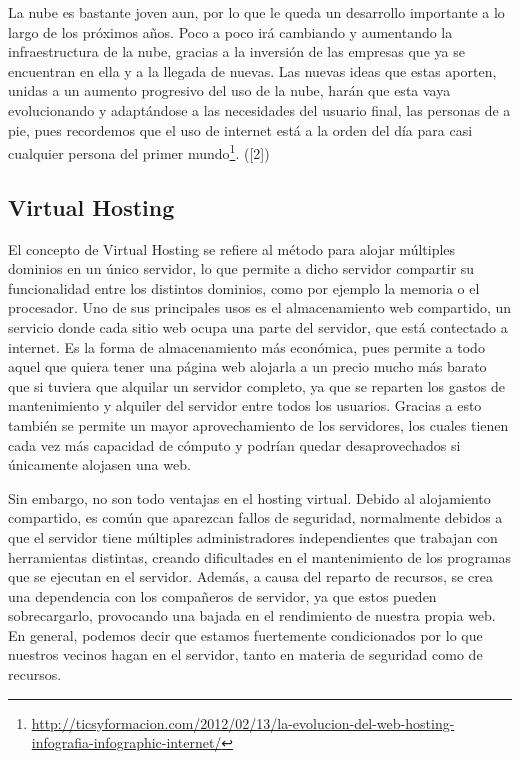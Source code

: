\documentclass[a4paper, 10pt]{article} %
\begin{document}
La nube es bastante joven aun, por lo que le queda un desarrollo importante a lo largo de los próximos años. Poco a poco irá cambiando y aumentando la infraestructura de la nube, gracias a la inversión de las empresas que ya se encuentran en ella y a la llegada de nuevas. Las nuevas ideas que estas aporten, unidas a un aumento progresivo del uso de la nube, harán que esta vaya evolucionando y adaptándose a las necesidades del usuario final, las personas de a pie, pues recordemos que el uso de internet está a la orden del día para casi cualquier persona del primer mundo\footnote{\url{http://ticsyformacion.com/2012/02/13/la-evolucion-del-web-hosting-infografia-infographic-internet/}}. ([2])

\subsection{Virtual Hosting}

El concepto de Virtual Hosting se refiere al método para alojar múltiples dominios en un único servidor, lo que permite a dicho servidor compartir su funcionalidad entre los distintos dominios, como por ejemplo la memoria o el procesador. Uno de sus principales usos es el almacenamiento web compartido, un servicio donde cada sitio web ocupa una parte del servidor, que está contectado a internet. Es la forma de almacenamiento más económica, pues permite a todo aquel que quiera tener una página web alojarla a un precio mucho más barato que si tuviera que alquilar un servidor completo, ya que se reparten los gastos de mantenimiento y alquiler del servidor entre todos los usuarios. Gracias a esto también se permite un mayor aprovechamiento de los servidores, los cuales tienen cada vez más capacidad de cómputo y podrían quedar desaprovechados si únicamente alojasen una web. 

Sin embargo, no son todo ventajas en el hosting virtual. Debido al alojamiento compartido, es común que aparezcan fallos de seguridad, normalmente debidos a que el servidor tiene múltiples administradores independientes que trabajan con herramientas distintas, creando dificultades en el mantenimiento de los programas que se ejecutan en el servidor. Además, a causa del reparto de recursos, se crea una dependencia con los compañeros de servidor, ya que estos pueden sobrecargarlo, provocando una bajada en el rendimiento de nuestra propia web. En general, podemos decir que estamos fuertemente condicionados por lo que nuestros vecinos hagan en el servidor, tanto en materia de seguridad como de recursos. 
\end{document}
